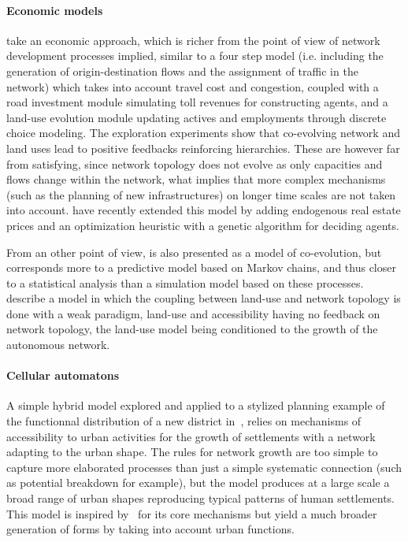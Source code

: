 \documentclass[11pt]{article}
\begin{document}
\paragraph{Economic models}



\cite{levinson2007co} take an economic approach, which is richer from the point of view of network development processes implied, similar to a four step model (i.e. including the generation of origin-destination flows and the assignment of traffic in the network) which takes into account travel cost and congestion, coupled with a road investment module simulating toll revenues for constructing agents, and a land-use evolution module updating actives and employments through discrete choice modeling. The exploration experiments show that co-evolving network and land uses lead to positive feedbacks reinforcing hierarchies. These are however far from satisfying, since network topology does not evolve as only capacities and flows change within the network, what implies that more complex mechanisms (such as the planning of new infrastructures) on longer time scales are not taken into account. \cite{li2016integrated} have recently extended this model by adding endogenous real estate prices and an optimization heuristic with a genetic algorithm for deciding agents.


From an other point of view, \citep{levinson2005paving} is also presented as a model of co-evolution, but corresponds more to a predictive model based on Markov chains, and thus closer to a statistical analysis than a simulation model based on these processes. \cite{rui2011urban} describe a model in which the coupling between land-use and network topology is done with a weak paradigm, land-use and accessibility having no feedback on network topology, the land-use model being conditioned to the growth of the autonomous network.




\paragraph{Cellular automatons}


A simple hybrid model explored and applied to a stylized planning example of the functionnal distribution of a new district in~\citep{raimbault2014hybrid}, relies on mechanisms of accessibility to urban activities for the growth of settlements with a network adapting to the urban shape. The rules for network growth are too simple to capture more elaborated processes than just a simple systematic connection (such as potential breakdown for example), but the model produces at a large scale a broad range of urban shapes reproducing typical patterns of human settlements. This model is inspired by~\citep{moreno2012automate} for its core mechanisms but yield a much broader generation of forms by taking into account urban functions.
\end{document}
